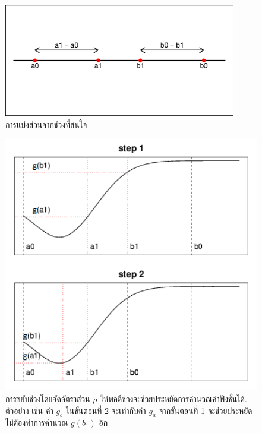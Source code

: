 %
\begin{figure}
\begin{center}
\includegraphics[width=4.0in]
{02Background/goldsecSectioning.eps}
\end{center}
\caption{การแบ่งส่วนจากช่วงที่สนใจ}
\label{fig: golden section sectioning}
\end{figure}
%

%
\begin{figure}
\begin{center}
\includegraphics[width=5.0in]
{02Background/CZ7p3.png}
\end{center}
\caption{การขยับช่วงโดยจัดอัตราส่วน $\rho$ ให้พอดีช่วงจะช่วยประหยัดการคำนวณค่าฟังชั่นได้.
ตัวอย่าง เช่น ค่า $g_b$ ในขั้นตอนที่ 2 จะเท่ากับค่า $g_a$ จากขั้นตอนที่ 1 จะช่วยประหยัดไม่ต้องทำการคำนวณ $g(b_1)$ อีก}
\label{fig: CZ7p3}
\end{figure}
%

